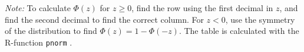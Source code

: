 \documentclass[twoside]{article}
\begin{document}
\begin{table}
    \medskip
    \emph{Note:} To calculate $\Phi(z)$ for $z\geq0$, find the row using the
    first decimal in $z$, and find the second decimal to find the correct
    column. For $z<0$, use the symmetry of the distribution to find  $\Phi(z) =
    1-\Phi(-z)$. The table is calculated with the R-function \texttt{pnorm} \citep{R2023}.
\end{table}
\end{document}
